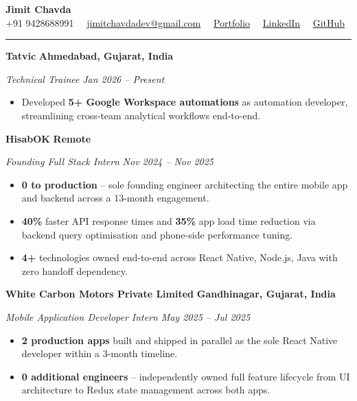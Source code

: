 \documentclass[10pt,letterpaper]{article}
\newcommand{\resumesection}[1]{%
  \vspace{6pt}%
  \noindent{\color{sectioncolor}\bfseries\large\MakeUppercase{#1}}%
  \vspace{2pt}%
  \hrule%
  \vspace{5pt}%
}
\begin{document}
\begin{center}
  {\Huge\bfseries Jimit Chavda} \\
  \vspace{4pt}
  {\small +91 9428688991 \ \textbullet\ \href{mailto:jimitchavdadev@gmail.com}{jimitchavdadev@gmail.com} \ \textbullet\ \href{https://portfolio-website-rnbw.onrender.com/}{Portfolio} \ \textbullet\ \href{https://www.linkedin.com/in/jimit-chavda/}{LinkedIn} \ \textbullet\ \href{https://github.com/jimitchavdadev}{GitHub}}
\end{center}

\resumesection{WORK EXPERIENCE}

\noindent \textbf{Tatvic} \hfill \textbf{Ahmedabad, Gujarat, India}\par
\noindent \textit{Technical Trainee} \hfill \textit{Jan 2026 -- Present}\par
\begin{itemize}
  \item Developed \textbf{5+ Google Workspace automations} as automation developer, streamlining cross-team analytical workflows end-to-end.
\end{itemize}
\vspace{4pt}

\noindent \textbf{HisabOK} \hfill \textbf{Remote}\par
\noindent \textit{Founding Full Stack Intern} \hfill \textit{Nov 2024 -- Nov 2025}\par
\begin{itemize}
  \item \textbf{0 to production} -- sole founding engineer architecting the entire mobile app and backend across a 13-month engagement.
  \item \textbf{40\%} faster API response times and \textbf{35\%} app load time reduction via backend query optimisation and phone-side performance tuning.
  \item \textbf{4+} technologies owned end-to-end across React Native, Node.js, Java with zero handoff dependency.
\end{itemize}
\vspace{4pt}

\noindent \textbf{White Carbon Motors Private Limited} \hfill \textbf{Gandhinagar, Gujarat, India}\par
\noindent \textit{Mobile Application Developer Intern} \hfill \textit{May 2025 -- Jul 2025}\par
\begin{itemize}
  \item \textbf{2 production apps} built and shipped in parallel as the sole React Native developer within a 3-month timeline.
  \item \textbf{0 additional engineers} -- independently owned full feature lifecycle from UI architecture to Redux state management across both apps.
\end{itemize}
\end{document}
